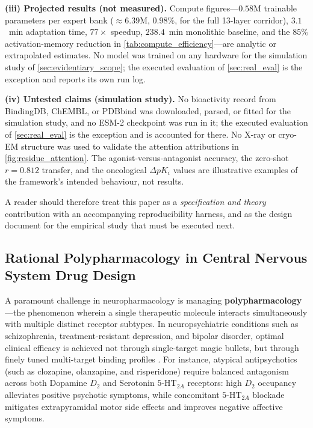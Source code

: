 \documentclass{article}
\theoremstyle{definition}
\begin{document}
\textbf{(iii) Projected results (not measured).} Compute figures---$0.58$M trainable parameters per expert bank ($\approx 6.39$M, $0.98\%$, for the full 13-layer corridor), $3.1$~min adaptation time, $77\times$ speedup, $238.4$~min monolithic baseline, and the $85\%$ activation-memory reduction in \cref{tab:compute_efficiency}---are analytic or extrapolated estimates. No model was trained on any hardware for the simulation study of \cref{sec:evidentiary_scope}; the executed evaluation of \cref{sec:real_eval} is the exception and reports its own run log.

\textbf{(iv) Untested claims (simulation study).} No bioactivity record from BindingDB, ChEMBL, or PDBbind was downloaded, parsed, or fitted for the simulation study, and no ESM-2 checkpoint was run in it; the executed evaluation of \cref{sec:real_eval} is the exception and is accounted for there. No X-ray or cryo-EM structure was used to validate the attention attributions in \cref{fig:residue_attention}. The agonist-versus-antagonist accuracy, the zero-shot $r = 0.812$ transfer, and the oncological $\Delta pK_i$ values are illustrative examples of the framework's intended behaviour, not results.

A reader should therefore treat this paper as a \emph{specification and theory} contribution with an accompanying reproducibility harness, and as the design document for the empirical study that must be executed next.

\subsection{Rational Polypharmacology in Central Nervous System Drug Design}
A paramount challenge in neuropharmacology is managing \textbf{polypharmacology}---the phenomenon wherein a single therapeutic molecule interacts simultaneously with multiple distinct receptor subtypes. In neuropsychiatric conditions such as schizophrenia, treatment-resistant depression, and bipolar disorder, optimal clinical efficacy is achieved not through single-target magic bullets, but through finely tuned multi-target binding profiles \citep{wang2018structure,kimura2019structures}. For instance, atypical antipsychotics (such as clozapine, olanzapine, and risperidone) require balanced antagonism across both Dopamine $D_2$ and Serotonin $5\text{-HT}_{2A}$ receptors: high $D_2$ occupancy alleviates positive psychotic symptoms, while concomitant $5\text{-HT}_{2A}$ blockade mitigates extrapyramidal motor side effects and improves negative affective symptoms.
\end{document}
